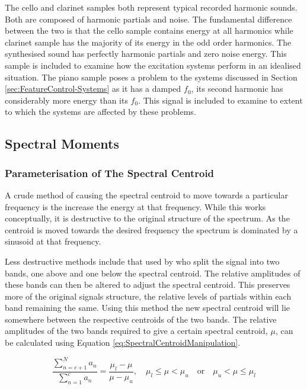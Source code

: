 	The cello and clarinet samples both represent typical recorded harmonic sounds. Both are composed of harmonic
	partials and noise. The fundamental difference between the two is that the cello sample contains energy at all
	harmonics while clarinet sample has the majority of its energy in the odd order harmonics. The synthesised sound
	has perfectly harmonic partials and zero noise energy. This sample is included to examine how the excitation
	systems perform in an idealised situation. The piano sample poses a problem to the systems discussed in Section
	\ref{sec:FeatureControl-Systems} as it has a damped $f_{0}$, its second harmonic has considerably more energy than
	its $f_{0}$. This signal is included to examine to extent to which the systems are affected by these problems.

	\subsection{Spectral Moments}
	\label{sec:FeatureControl-Parameterisation-SpectralMoments}
		\subsubsection*{Parameterisation of The Spectral Centroid}
			A crude method of causing the spectral centroid to move towards a particular frequency is the
			increase the energy at that frequency. While this works conceptually, it is destructive to the
			original structure of the spectrum. As the centroid is moved towards the desired frequency the
			spectrum is dominated by a sinusoid at that frequency.

			Less destructive methods include that used by \citet{zacharakis2011an} who split the signal into
			two bands, one above and one below the spectral centroid. The relative amplitudes of these bands
			can then be altered to adjust the spectral centroid. This preserves more of the original signals
			structure, the relative levels of partials within each band remaining the same. Using this method
			the new spectral centroid will lie somewhere between the respective centroids of the two bands. The
			relative amplitudes of the two bands required to give a certain spectral centroid, $\mu$, can be
			calculated using Equation \ref{eq:SpectralCentroidManipulation}.

			\begin{equation}
				\frac{\sum_{n = c + 1}^{N} a_{n}}
				     {{\sum_{n = 1}^{c} a_{n}}} = 
				\frac{\mu_{l} - \mu}{\mu - \mu_{u}}, 
				\quad \mu_{l} \leq \mu < \mu_{u} \quad \textrm{or} \quad \mu_{u} < \mu \leq \mu_{l}
				\label{eq:SpectralCentroidManipulation}
			\end{equation}

